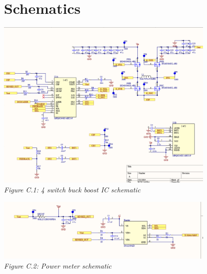 \section{Schematics} \label{appendix:c}

\begin{center}
    \includegraphics[width=0.8\textwidth]{images/buck_boost_schematic.png}\\
    \it Figure C.1: 4 switch buck boost IC schematic\\
    \vspace{\baselineskip}

    \includegraphics[width=0.8\textwidth]{images/power_meter_schematic.png}\\
    \it Figure C.2: Power meter schematic\\
\end{center}

